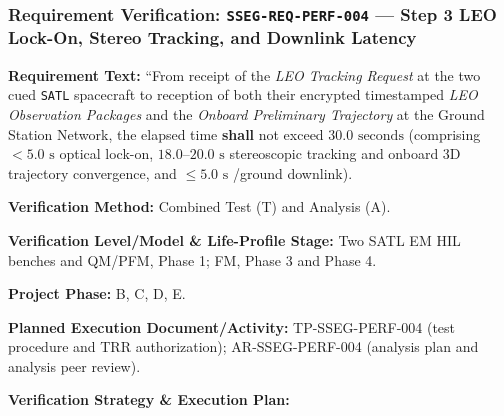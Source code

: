 \subsubsection{Requirement Verification: \texttt{SSEG-REQ-PERF-004} --- Step 3 LEO Lock-On, Stereo Tracking, and Downlink Latency}
\label{ver:SSEG-REQ-PERF-004}
\textbf{Requirement Text:} ``From receipt of the \emph{LEO Tracking Request} at the two cued \texttt{SATL} spacecraft to reception of both their encrypted timestamped \emph{LEO Observation Packages} and the \emph{Onboard Preliminary Trajectory} at the Ground Station Network, the elapsed time \textbf{shall} not exceed $30.0\text{ seconds}$ (comprising $< 5.0\text{ s}$ optical  lock-on, $18.0\text{--}20.0\text{ s}$ stereoscopic tracking and onboard 3D trajectory convergence, and $\le 5.0\text{ s}$ /ground downlink).
\par\textbf{Verification Method:} Combined Test (T) and Analysis (A).
\par\textbf{Verification Level/Model \& Life-Profile Stage:} Two SATL EM HIL benches and QM/PFM, Phase 1; FM, Phase 3 and Phase 4.
\par\textbf{Project Phase:} B, C, D, E.
\par\textbf{Planned Execution Document/Activity:} TP-SSEG-PERF-004 (test procedure and TRR authorization); AR-SSEG-PERF-004 (analysis plan and analysis peer review).
\par\textbf{Verification Strategy \& Execution Plan:}
